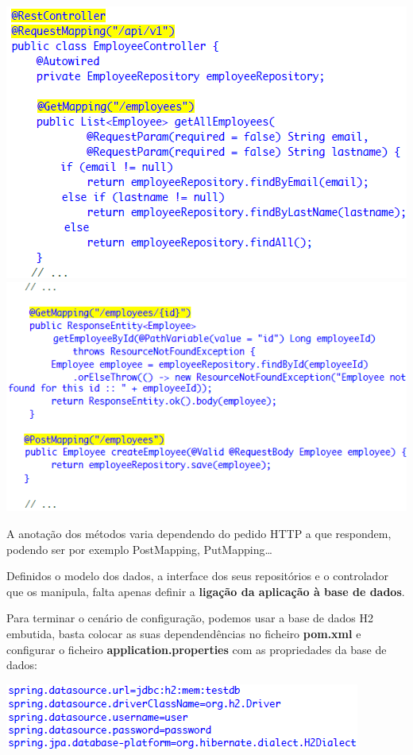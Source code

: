 \documentclass{article}
\begin{document}
\begin{center}
  \includegraphics[scale=0.5]{94}
  \includegraphics[scale=0.5]{95}
\end{center}

A anotação dos métodos varia dependendo do pedido HTTP a que respondem, podendo ser por exemplo
PostMapping, PutMapping\dots

\vspace{2mm}
Definidos o modelo dos dados, a interface dos seus repositórios e o
controlador que os manipula, falta apenas definir a \textbf{ligação da aplicação à
base de dados}.

Para terminar o cenário de configuração, podemos usar a
base de dados H2 embutida, basta colocar as suas dependendências
no ficheiro \textbf{pom.xml} e configurar o ficheiro \textbf{application.properties}
com as propriedades da base de dados:

\begin{center}
  \includegraphics[scale=0.6]{96}
\end{center}
\end{document}
